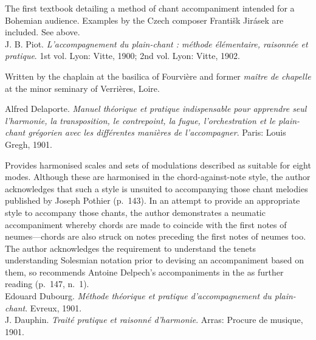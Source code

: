      \parindent=20pt
     \hangindent=20pt
     The first textbook detailing a method of chant accompaniment intended for a Bohemian audience. Examples by the Czech composer Františk Jirásek are included. See  above.\\

    \parindent=0pt
    \hangindent=0pt
  \covid{}J. B. Piot. \emph{L'accompagnement du plain-chant : méthode élémentaire, raisonnée et pratique}. 1st vol. Lyon:  Vitte, 1900;  2nd vol. Lyon:  Vitte, 1902.

     \parindent=20pt
     \hangindent=20pt
     Written by the chaplain at the basilica of Fourvière and former \emph{maître de chapelle} at the minor seminary of Verrières, Loire.\\\pagebreak{}

    \parindent=0pt
    \hangindent=0pt
  Alfred Delaporte. \emph{Manuel théorique et pratique indispensable pour apprendre seul l'harmonie, la transposition, le contrepoint, la fugue, l'orchestration et le plain-chant grégorien avec les différentes manières de l'accompagner}. Paris:  Louis Gregh, 1901.

     \parindent=20pt
     \hangindent=20pt
     Provides harmonised scales and sets of modulations described as suitable for eight modes. Although these are harmonised in the chord-against-note style, the author acknowledges that such a style is unsuited to accompanying those chant melodies published by Joseph Pothier (p.~143). In an attempt to provide an appropriate style to accompany those chants, the author demonstrates a neumatic accompaniment whereby chords are made to coincide with the first notes of neumes---chords are also struck on notes preceding the first notes of neumes too. The author acknowledges the requirement to understand the tenets understanding Solesmian notation prior to devising an accompaniment based on them, so recommends Antoine Delpech's accompaniments in the \ldo{} as further reading (p.~147, n.~1).\\

    \parindent=0pt
    \hangindent=0pt
  \covid{}Edouard Dubourg. \emph{Méthode théorique et pratique d'accompagnement du plain-chant}. Evreux, 1901. \\

    \parindent=0pt
    \hangindent=0pt
    J. Dauphin. \emph{Traité pratique et raisonné d'harmonie}. Arras:  Procure de musique, 1901.

